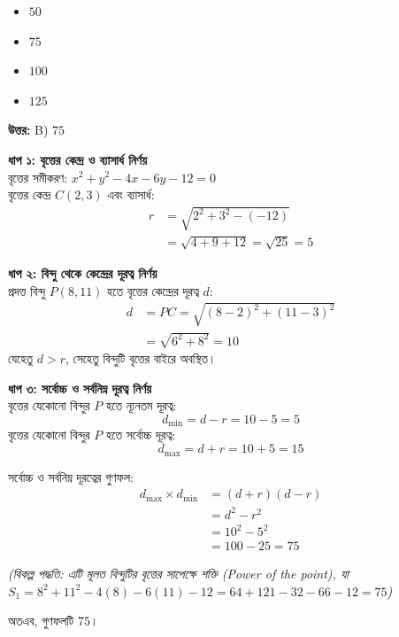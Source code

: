 \documentclass[12pt, a4paper]{article}
\begin{document}
\vspace{1em}
\begin{itemize}[label={}, leftmargin=1cm, itemsep=0.5em]
    \item[\textbf{A)}] $50$
    \item[\textbf{B)}] $75$
    \item[\textbf{C)}] $100$
    \item[\textbf{D)}] $125$
\end{itemize}

\vspace{0.5em}
\begin{tcolorbox}[answerbox]
    \textbf{\color{success} উত্তর:} B) $75$
\end{tcolorbox}
\vspace{1em}

\begin{tcolorbox}[solutionbox={সমাধান (Solution)}]
    \noindent
    \textbf{ধাপ ১: বৃত্তের কেন্দ্র ও ব্যাসার্ধ নির্ণয়} \\
    বৃত্তের সমীকরণ: $x^2 + y^2 - 4x - 6y - 12 = 0$ \\
    বৃত্তের কেন্দ্র $C(2, 3)$ এবং ব্যাসার্ধ:
    \begin{align*}
        r &= \sqrt{2^2 + 3^2 - (-12)} \\
          &= \sqrt{4 + 9 + 12} = \sqrt{25} = 5
    \end{align*}
    
    \vspace{0.5em}
    \textbf{ধাপ ২: বিন্দু থেকে কেন্দ্রের দূরত্ব নির্ণয়} \\
    প্রদত্ত বিন্দু $P(8, 11)$ হতে বৃত্তের কেন্দ্রের দূরত্ব $d$:
    \begin{align*}
        d &= PC = \sqrt{(8 - 2)^2 + (11 - 3)^2} \\
          &= \sqrt{6^2 + 8^2} = 10
    \end{align*}
    যেহেতু $d > r$, সেহেতু বিন্দুটি বৃত্তের বাইরে অবস্থিত।
    
    \vspace{0.5em}
    \textbf{ধাপ ৩: সর্বোচ্চ ও সর্বনিম্ন দূরত্ব নির্ণয়} \\
    বৃত্তের যেকোনো বিন্দুর $P$ হতে ন্যূনতম দূরত্ব:
    \[ d_{\min} = d - r = 10 - 5 = 5 \]
    বৃত্তের যেকোনো বিন্দুর $P$ হতে সর্বোচ্চ দূরত্ব:
    \[ d_{\max} = d + r = 10 + 5 = 15 \]
    
    সর্বোচ্চ ও সর্বনিম্ন দূরত্বের গুণফল:
    \begin{align*}
        d_{\max} \times d_{\min} &= (d + r)(d - r) \\
                                 &= d^2 - r^2 \\
                                 &= 10^2 - 5^2 \\
                                 &= 100 - 25 = 75
    \end{align*}
    
    \textit{(বিকল্প পদ্ধতি: এটি মূলত বিন্দুটির বৃত্তের সাপেক্ষে শক্তি (Power of the point), যা $S_1 = 8^2 + 11^2 - 4(8) - 6(11) - 12 = 64 + 121 - 32 - 66 - 12 = 75$)}
    
    \vspace{0.5em}
    অতএব, গুণফলটি \textbf{$75$}।
\end{tcolorbox}
\end{document}
